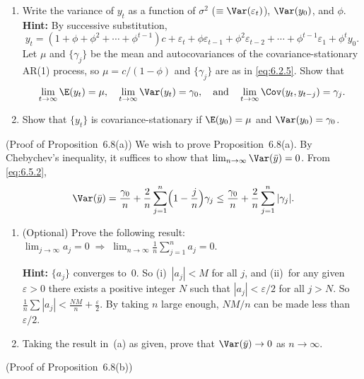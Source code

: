 \begin{problemset}
\begin{enumerate}[label=(\alph*)]
\item Write the variance of $y_t$ as a function of $\sigma^2$ ($\equiv \Var(\varepsilon_t)$), $\Var(y_0)$, and $\phi$.
\textbf{Hint:} By successive substitution,
\[
  y_t = (1 + \phi + \phi^2 + \cdots + \phi^{t-1})c + \varepsilon_t + \phi\varepsilon_{t-1} + \phi^2\varepsilon_{t-2}
  + \cdots + \phi^{t-1}\varepsilon_1 + \phi^t y_0.
\]
Let $\mu$ and $\{\gamma_j\}$ be the mean and autocovariances of the covariance-stationary
AR(1) process, so $\mu = c/(1-\phi)$ and $\{\gamma_j\}$ are as in \eqref{eq:6.2.5}.
Show that
\begin{gather*}
  \lim_{t \to \infty} \E(y_t) = \mu, \quad
  \lim_{t \to \infty} \Var(y_t) = \gamma_0, \quad \text{and} \quad
  \lim_{t \to \infty} \Cov(y_t, y_{t-j}) = \gamma_j.
\end{gather*}

\item Show that $\{y_t\}$ is covariance-stationary if $\E(y_0) = \mu$ and $\Var(y_0) = \gamma_0$.
\end{enumerate}

\exercise[9] (Proof of Proposition~6.8(a)) \; We wish to prove Proposition~6.8(a). By Chebychev's
inequality, it suffices to show that $\lim_{n \to \infty} \Var(\bar{y}) = 0$. From \eqref{eq:6.5.2},
\[
  \Var(\bar{y}) = \frac{\gamma_0}{n} + \frac{2}{n} \sum_{j=1}^{n} \Bigl(1 - \frac{j}{n}\Bigr) \gamma_j
  \leq \frac{\gamma_0}{n} + \frac{2}{n} \sum_{j=1}^{n} |\gamma_j|.
\]

\begin{enumerate}[label=(\alph*)]
\item (Optional) \; Prove the following result:
$\lim_{j \to \infty} a_j = 0 \;\Rightarrow\; \lim_{n \to \infty} \frac{1}{n} \sum_{j=1}^{n} a_j = 0$.

\textbf{Hint:} $\{a_j\}$ converges to~0. So (i)~$|a_j| < M$ for all $j$, and (ii)~for any given $\varepsilon >
0$ there exists a positive integer $N$ such that $|a_j| < \varepsilon/2$ for all $j > N$. So
$\frac{1}{n}\sum |a_j| < \frac{NM}{n} + \frac{\varepsilon}{2}$.
By taking $n$ large enough, $NM/n$ can be made less than $\varepsilon/2$.

\item Taking the result in~(a) as given, prove that $\Var(\bar{y}) \to 0$ as $n \to \infty$.
\end{enumerate}

\exercise[10] (Proof of Proposition~6.8(b))


\end{problemset}
